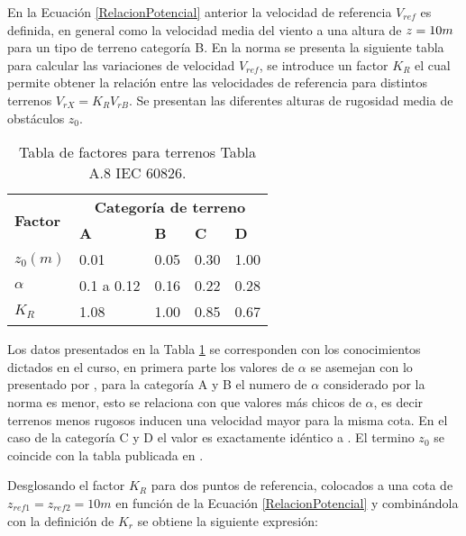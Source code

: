 En la Ecuación \eqref{RelacionPotencial} anterior la velocidad de referencia $V_{ref}$ es definida, en general como la velocidad media del viento a una altura de $z=10\vspace{.1cm}m$ para un tipo de terreno categoría B. En la norma se presenta la siguiente tabla para calcular las variaciones de velocidad $V_{ref}$, se introduce un factor $K_R$ el cual permite obtener la relación entre las velocidades de referencia para distintos terrenos $V_{rX}=K_RV_{rB}$. Se presentan las diferentes alturas de rugosidad media de obstáculos $z_0$.


\begin{table}[h] 
	\begin{footnotesize} 
		\begin{center} 
			\begin{tabular}{ |p{3cm}|p{2cm}|p{2cm}|p{2cm}|p{2cm}|} \hline
				\multirow{2}{*}{\textbf{Factor}}  & \multicolumn{4}{|c|}{ \textbf{Categoría de terreno} }  \\ 
				& \textbf{A}& \textbf{B} &\textbf{C}&\textbf{D}\\
				\hline
				$z_0(m)$   & 0.01    &0.05&  0.30 & 1.00\\ \hline
				$\alpha$& 0.1 a 0.12  & 0.16 & 0.22 &0.28\\ \hline
				$K_R$ & 1.08 &1.00 &0.85&  0.67\\ \hline
			\end{tabular}
		\end{center} 
		\caption{Tabla de factores para terrenos Tabla A.8 IEC 60826.}
		\label{Tab:laValoresTerrenos} 
	\end{footnotesize} 
\end{table}

Los datos presentados en la Tabla \ref{Tab:laValoresTerrenos} se corresponden con los conocimientos dictados en el curso, en primera parte los valores de $\alpha$ se asemejan con lo presentado por \cite{Davenport1960}, para la categoría A y B el numero de $\alpha$ considerado por la norma es menor, esto se relaciona con que valores más chicos de $\alpha$, es decir terrenos menos rugosos inducen una velocidad mayor para la misma cota. En el caso de la categoría C y D el valor es exactamente idéntico a \cite{Davenport1960} . El termino $z_0$ se coincide con la tabla publicada en \cite{Oke2000}.

Desglosando el factor $K_R$ para dos puntos de referencia, colocados a una cota de $z_{ref1}=z_{ref2}=10m$ en función de la Ecuación \eqref{RelacionPotencial} y combinándola con la definición de $K_r$ se obtiene la siguiente expresión: 


